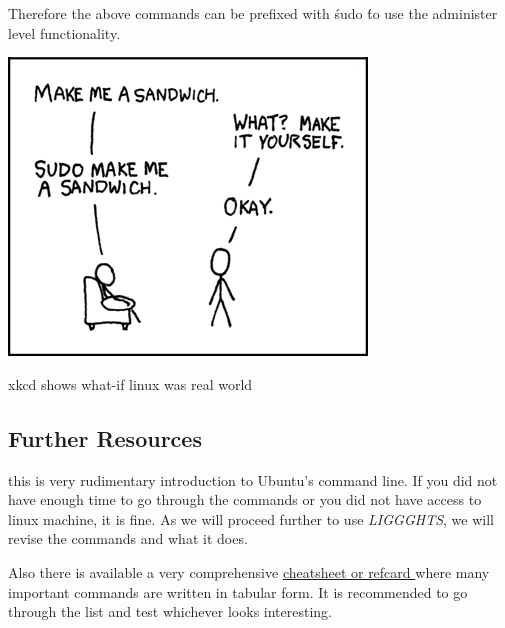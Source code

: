 \documentclass{tufte-book} %
\newcommand{\Li}{\textit{LIGGGHTS}}
\begin{document}
Therefore the above commands can be prefixed with \' sudo \'  to use the administer level functionality.

\begin{marginfigure}
\includegraphics[width=\linewidth]{sandwich.png}
\caption{xkcd shows what-if linux was real world}
\label{fig:sandwich}
\end{marginfigure}

\subsection{Further Resources}
 this is very rudimentary introduction to Ubuntu's command line. If you did not have enough time to go through the commands or you did not have access to linux machine, it is fine. As we will proceed further to use \Li, we will revise the commands and what it does.

Also there is available a very comprehensive \href{http://cli.learncodethehardway.org/bash_cheat_sheet.pdf}{cheatsheet or refcard } where many important commands are written in tabular form. It is recommended to go through the list and test whichever looks interesting. 
\end{document}
